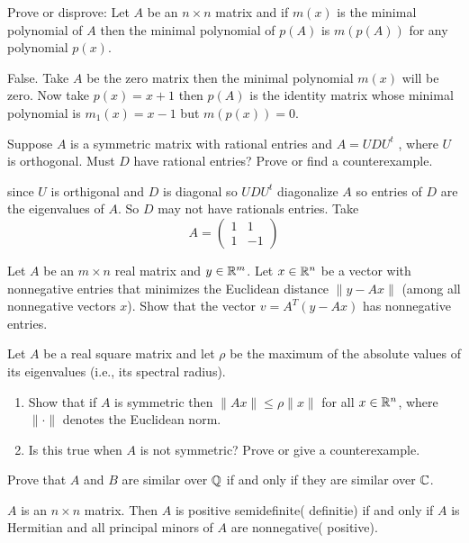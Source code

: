 \question Prove or disprove: Let $A$ be an $n\times n$ matrix and if $m(x)$ is the minimal polynomial of $A$ then the minimal polynomial of $p(A)$ is $m(p(A))$ for any polynomial $p(x)$.
\begin{solution}
    False. Take $A$ be the zero matrix then the minimal polynomial $m(x)$ will be zero. Now take $p(x)=x+1$ then $p(A)$ is the identity matrix whose minimal polynomial is $m_1(x)=x-1$ but $m(p(x))=0$.
\end{solution}

\question[7A, Sp16] Suppose $A$ is a symmetric matrix with rational entries and $A=UDU^{t}$ , where $U$ is orthogonal. Must $D$ have rational entries? Prove or find a counterexample.

\begin{solution}
    since $U$ is orthigonal and $D$ is diagonal so $UDU^{t}$ diagonalize $A$ so entries of $D$ are the eigenvalues of $A$. So $D$ may not have rationals entries. Take
    $$A=\begin{pmatrix}
        1&1\\
        1&-1
    \end{pmatrix}$$
\end{solution}

\question[6B, Sp16] Let $A$ be an $m\times n$ real matrix and $y\in\mathbb{R}^m$. Let $x\in\mathbb{R}^n$ be a vector with nonnegative entries that minimizes the Euclidean distance $\|y-Ax\|$ (among all nonnegative vectors $x$). Show that the vector $v=A^T(y-Ax)$ has nonnegative entries.

\question[7B, Sp16] Let $A$ be a real square matrix and let $\rho$ be the maximum of the absolute values of its eigenvalues (i.e., its spectral radius).
\begin{enumerate}
    \item Show that if $A$ is symmetric then $\|Ax\|\leq\rho\|x\|$ for all $x\in\mathbb{R}^n$, where $\|\cdot\|$ denotes the Euclidean norm.
    \item Is this true when $A$ is not symmetric? Prove or give a counterexample.
\end{enumerate}

\question[7A, Fall16] Prove that $A$ and $B$ are similar over $\mathbb{Q}$ if and only if they are similar over $\mathbb{C}$.

\question $A$ is an $n\times n$ matrix. Then $A$ is positive semidefinite( definitie) if and only if $A$ is Hermitian and all principal minors of $A$ are nonnegative( positive).

